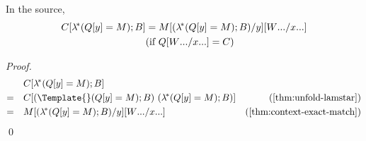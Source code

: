 
\begin{lemma}
  \label{thm:context-lamstar-match}
  In the source,
  \begin{align*}
    C[\lamstar (Q[y] = M); B]
    &=
    M\subst{y}{(\lamstar (Q[y] = M); B)}\subst{\many{x}}{\many{W}}
    \\
    &(\text{if } Q\subst{\many{x}}{\many{W}} = C)
  \end{align*}
\end{lemma}
\begin{proof}
  \begin{align*}
    &\quad
    C[\lamstar (Q[y] = M); B]
    \\
    =&\quad
    C[(\Template{} (Q[y] = M); B)~(\lamstar (Q[y]=M); B)]
    &(\cref{thm:unfold-lamstar})
    \\
    =&\quad
    M\subst{y}{(\lamstar (Q[y]=M); B)}\subst{\many{x}}{\many{W}}
    &(\cref{thm:context-exact-match})
  \end{align*}
  \qed
\end{proof}

